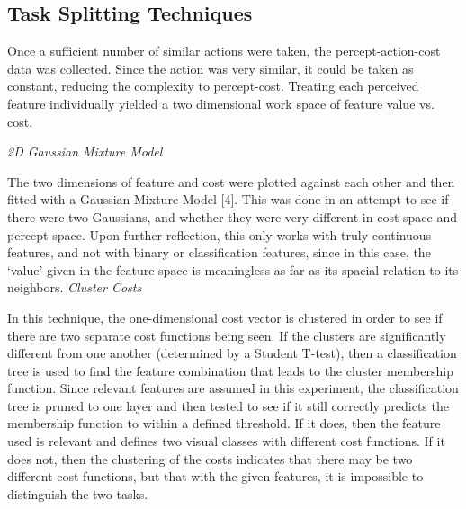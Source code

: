 \documentclass[12pt]{article}
\begin{document}
\subsection{Task Splitting Techniques}

Once a sufficient number of similar actions were taken, the percept-action-cost data was collected. Since the action was very similar, it could be taken as constant, reducing the complexity to percept-cost. Treating each perceived feature individually yielded a two dimensional work space of feature value vs. cost. 

\emph{2D Gaussian Mixture Model}\newline

The two dimensions of feature and cost were plotted against each other and then fitted with a Gaussian Mixture Model [4]. This was done in an attempt to see if there were two Gaussians, and whether they were very different in cost-space and percept-space. Upon further reflection, this only works with truly continuous features, and not with binary or classification features, since in this case, the `value' given in the feature space is meaningless as far as its spacial relation to its neighbors.\newline\newline
\emph{Cluster Costs}\newline

In this technique, the one-dimensional cost vector is clustered in order to see if there are two separate cost functions being seen. If the clusters are significantly different from one another (determined by a Student T-test), then a classification tree is used to find the feature combination that leads to the cluster membership function. Since relevant features are assumed in this experiment, the classification tree is pruned to one layer and then tested to see if it still correctly predicts the membership function to within a defined threshold. If it does, then the feature used is relevant and defines two visual classes with different cost functions. If it does not, then the clustering of the costs indicates that there may be two different cost functions, but that with the given features, it is impossible to distinguish the two tasks. 
\end{document}
